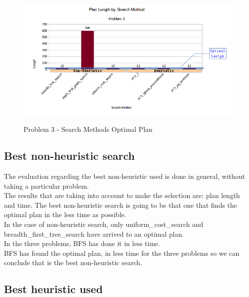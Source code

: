 \documentclass[10pt, a4paper,english]{article}
\begin{document}
\begin{figure}[h]
\begin{center}
\includegraphics[width=1\textwidth]{problem3.png}\\
\caption{Problem 3 - Search Methods Optimal Plan}
\end{center}
\end{figure}

\subsection{Best non-heuristic search}

The evaluation regarding the best non-heuristic used is done in general, without taking a particular problem. \\

The results that are taking into account to make the selection are: plan length and time. The best non-heuristic search is going to be that one that finds the optimal plan in the less time as possible. \\

In the case of non-heuristic search, only uniform\_cost\_search and breadth\_first\_tree\_search have arrived to an optimal plan. \\

In the three problems, BFS has done it in less time. \\

BFS has found the optimal plan, in less time for the three problems so we can conclude that is the best non-heuristic search. \\


\subsection{Best heuristic used}
\end{document}
